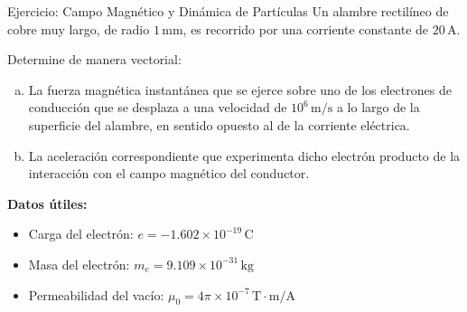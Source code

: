 \documentclass[10pt, aspectratio=169]{beamer}
\begin{document}
\begin{frame}{Ejercicio: Campo Magnético y Dinámica de Partículas}
    Un alambre rectilíneo de cobre muy largo, de radio $1 \, \unit{\milli\meter}$, es recorrido por una corriente constante de $20 \, \unit{\ampere}$.

    Determine de manera vectorial:
    \begin{enumerate}[a)]
        \item La fuerza magnética instantánea que se ejerce sobre uno de los electrones de conducción que se desplaza a una velocidad de $10^{6} \, \unit{\meter/\second}$ a lo largo de la superficie del alambre, en sentido opuesto al de la corriente eléctrica.
        \item La aceleración correspondiente que experimenta dicho electrón producto de la interacción con el campo magnético del conductor.
    \end{enumerate}

    \vspace{0.3cm}
    \begin{small}
        \textbf{Datos útiles:}
        \begin{itemize}
            \item Carga del electrón: $e = -1.602 \times 10^{-19} \, \unit{\coulomb}$
            \item Masa del electrón: $m_e = 9.109 \times 10^{-31} \, \unit{\kilogram}$
            \item Permeabilidad del vacío: $\mu_0 = 4\pi \times 10^{-7} \, \unit{\tesla\cdot\meter/\ampere}$
        \end{itemize}
    \end{small}
\end{frame}
\end{document}
